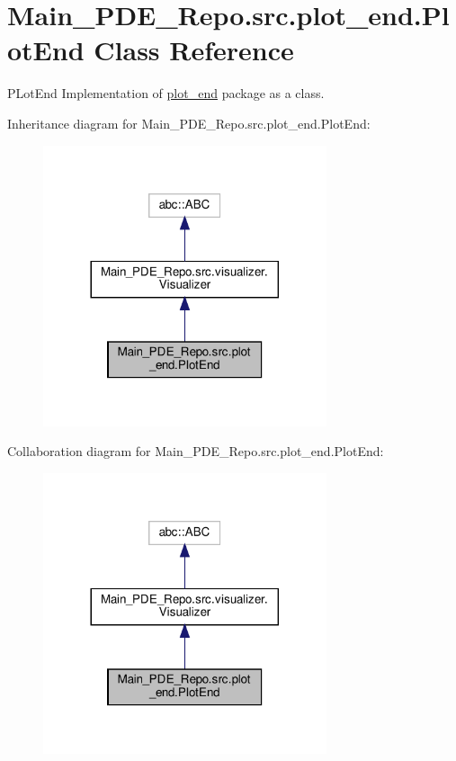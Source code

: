 \hypertarget{classMain__PDE__Repo_1_1src_1_1plot__end_1_1PlotEnd}{}\section{Main\+\_\+\+P\+D\+E\+\_\+\+Repo.\+src.\+plot\+\_\+end.\+Plot\+End Class Reference}
\label{classMain__PDE__Repo_1_1src_1_1plot__end_1_1PlotEnd}


P\+Lot\+End Implementation of \hyperlink{namespaceMain__PDE__Repo_1_1src_1_1plot__end}{plot\+\_\+end} package as a class.  




Inheritance diagram for Main\+\_\+\+P\+D\+E\+\_\+\+Repo.\+src.\+plot\+\_\+end.\+Plot\+End\+:
\nopagebreak
\begin{figure}[H]
\begin{center}
\leavevmode
\includegraphics[width=236pt]{classMain__PDE__Repo_1_1src_1_1plot__end_1_1PlotEnd__inherit__graph}
\end{center}
\end{figure}


Collaboration diagram for Main\+\_\+\+P\+D\+E\+\_\+\+Repo.\+src.\+plot\+\_\+end.\+Plot\+End\+:
\nopagebreak
\begin{figure}[H]
\begin{center}
\leavevmode
\includegraphics[width=236pt]{classMain__PDE__Repo_1_1src_1_1plot__end_1_1PlotEnd__coll__graph}
\end{center}
\end{figure}
